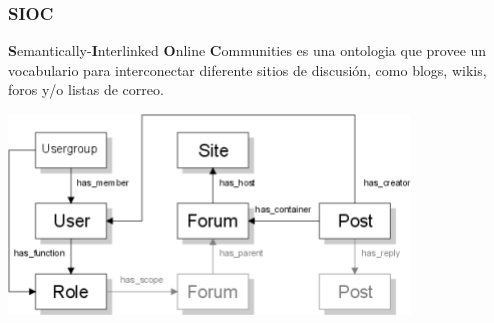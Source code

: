 \documentclass[spanish,notes=hide]{beamer}
\begin{document}
{
  \frametitle{SIOC}

  \begin{Large}
    \textbf{S}emantically-\textbf{I}nterlinked \textbf{O}nline \textbf{C}ommunities 
    es una ontologia que provee un vocabulario para interconectar diferente sitios
    de discusión, como blogs, wikis, foros y/o listas de correo.
  \end{Large}

  \begin{center}
    \includegraphics[width=0.8\textwidth]{images/sioc-terms.png}
  \end{center}

}
\end{document}
